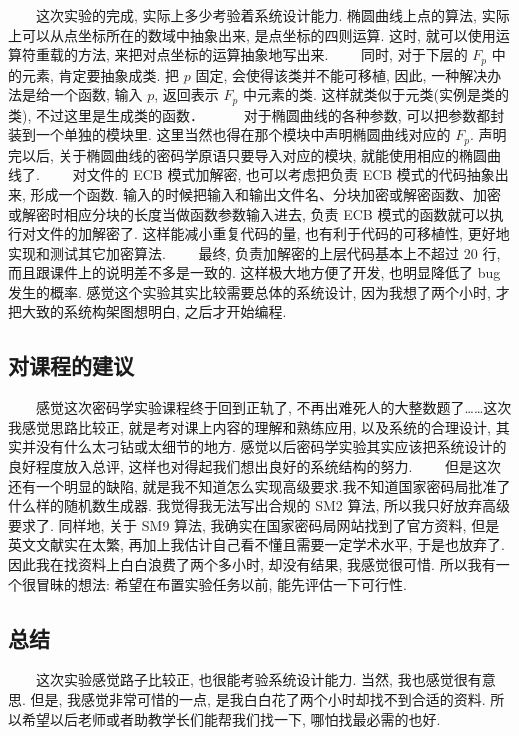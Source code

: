 \documentclass[12pt,a4paper]{article}
\begin{document}
　　这次实验的完成, 实际上多少考验着系统设计能力. 椭圆曲线上点的算法, 实际上可以从点坐标所在的数域中抽象出来, 是点坐标的四则运算. 这时, 就可以使用运算符重载的方法, 来把对点坐标的运算抽象地写出来. 
\newline
　　同时, 对于下层的 $ F_p $ 中的元素, 肯定要抽象成类. 把 $ p $ 固定, 会使得该类并不能可移植, 因此, 一种解决办法是给一个函数, 输入 $ p $, 返回表示 $ F_p $ 中元素的类. 这样就类似于元类(实例是类的类), 不过这里是生成类的函数．　
\newline
　　对于椭圆曲线的各种参数, 可以把参数都封装到一个单独的模块里. 这里当然也得在那个模块中声明椭圆曲线对应的 $ F_p $. 声明完以后, 关于椭圆曲线的密码学原语只要导入对应的模块, 就能使用相应的椭圆曲线了. 
\newline
　　对文件的 ECB 模式加解密, 也可以考虑把负责 ECB 模式的代码抽象出来, 形成一个函数. 输入的时候把输入和输出文件名、分块加密或解密函数、加密或解密时相应分块的长度当做函数参数输入进去, 负责 ECB 模式的函数就可以执行对文件的加解密了. 这样能减小重复代码的量, 也有利于代码的可移植性, 更好地实现和测试其它加密算法. 
\newline
　　最终, 负责加解密的上层代码基本上不超过 20 行, 而且跟课件上的说明差不多是一致的. 这样极大地方便了开发, 也明显降低了 bug 发生的概率. 感觉这个实验其实比较需要总体的系统设计, 因为我想了两个小时, 才把大致的系统构架图想明白, 之后才开始编程. 

\subsection*{对课程的建议}

　　感觉这次密码学实验课程终于回到正轨了, 不再出难死人的大整数题了……这次我感觉思路比较正, 就是考对课上内容的理解和熟练应用, 以及系统的合理设计, 其实并没有什么太刁钻或太细节的地方. 感觉以后密码学实验其实应该把系统设计的良好程度放入总评, 这样也对得起我们想出良好的系统结构的努力. 
\newline
　　但是这次还有一个明显的缺陷, 就是我不知道怎么实现高级要求.我不知道国家密码局批准了什么样的随机数生成器. 我觉得我无法写出合规的 SM2 算法, 所以我只好放弃高级要求了. 同样地, 关于 SM9 算法, 我确实在国家密码局网站找到了官方资料, 但是英文文献实在太繁, 再加上我估计自己看不懂且需要一定学术水平, 于是也放弃了. 因此我在找资料上白白浪费了两个多小时, 却没有结果, 我感觉很可惜. 所以我有一个很冒昧的想法: 希望在布置实验任务以前, 能先评估一下可行性. 

\subsection*{总结}

　　这次实验感觉路子比较正, 也很能考验系统设计能力. 当然, 我也感觉很有意思. 但是, 我感觉非常可惜的一点, 是我白白花了两个小时却找不到合适的资料. 所以希望以后老师或者助教学长们能帮我们找一下, 哪怕找最必需的也好. 
\end{document}
